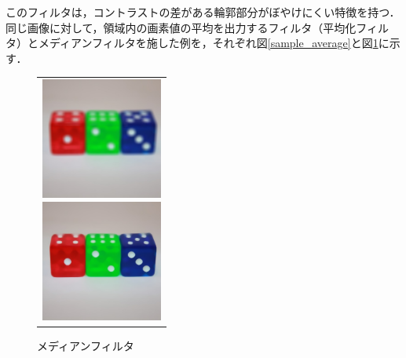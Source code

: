 \documentclass[openright]{nitocs}
\numberwithin{equation}{section}
\begin{document}
            このフィルタは，コントラストの差がある輪郭部分がぼやけにくい特徴を持つ．
            同じ画像に対して，領域内の画素値の平均を出力するフィルタ（平均化フィルタ）とメディアンフィルタを施した例を，それぞれ図\ref{sample_average}と図\ref{sample_median}に示す．
            \begin{figure}[tb] %
                \begin{center}
                  \begin{tabular}{c}
                    \begin{minipage}{0.5\hsize}
                      \begin{center}
                        \includegraphics[clip,width=40mm]{sample_average.jpg}
                    \caption{平均化フィルタ}
                    \label{sample_average}
                      \end{center}
                    \end{minipage}
                    \begin{minipage}{0.5\hsize}
                      \begin{center}
                        \includegraphics[clip,width=40mm]{sample_median.jpg}
                    \caption{メディアンフィルタ}
                    \label{sample_median}
                      \end{center}
                    \end{minipage}
                  \end{tabular}
                \end{center}
            \end{figure}
\end{document}
